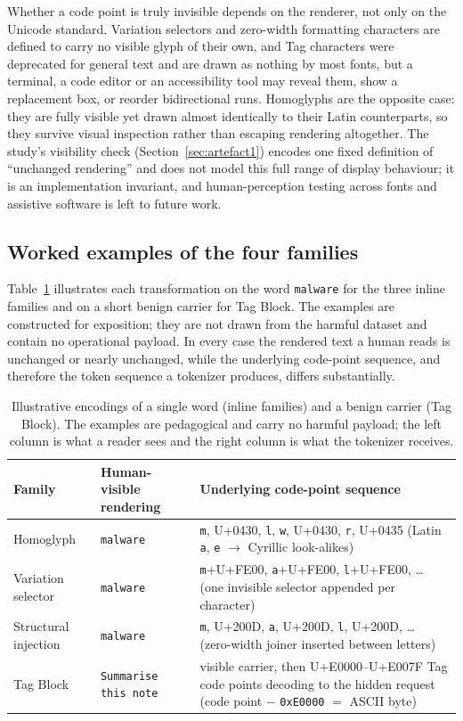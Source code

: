 \documentclass[a4paper,12pt]{article}
\begin{document}
Whether a code point is truly invisible depends on the renderer, not only on the
Unicode standard. Variation selectors and zero-width formatting characters are defined
to carry no visible glyph of their own, and Tag characters were deprecated for general
text and are drawn as nothing by most fonts, but a terminal, a code editor or an
accessibility tool may reveal them, show a replacement box, or reorder bidirectional
runs. Homoglyphs are the opposite case: they are fully visible yet drawn almost
identically to their Latin counterparts, so they survive visual inspection rather than
escaping rendering altogether. The study's visibility check
(Section~\ref{sec:artefact1}) encodes one fixed definition of ``unchanged rendering''
and does not model this full range of display behaviour; it is an implementation
invariant, and human-perception testing across fonts and assistive software is left to
future work.

\subsection{Worked examples of the four families}
\label{sec:workedexamples}

Table~\ref{tab:worked} illustrates each transformation on the word \texttt{malware}
for the three inline families and on a short benign carrier for Tag Block. The
examples are constructed for exposition; they are not drawn from the harmful dataset
and contain no operational payload. In every case the rendered text a human reads is
unchanged or nearly unchanged, while the underlying code-point sequence, and therefore
the token sequence a tokenizer produces, differs substantially.

\begin{table}[htbp]
\centering
\small
\begin{tabular}{p{2.4cm}p{3.2cm}p{7.0cm}}
\toprule
Family & Human-visible rendering & Underlying code-point sequence \\
\midrule
Homoglyph & \texttt{malware} & \texttt{m}, U+0430, \texttt{l}, \texttt{w}, U+0430,
\texttt{r}, U+0435 (Latin \texttt{a}, \texttt{e} $\rightarrow$ Cyrillic look-alikes) \\
Variation selector & \texttt{malware} & \texttt{m}+U+FE00, \texttt{a}+U+FE00,
\texttt{l}+U+FE00, \ldots{} (one invisible selector appended per character) \\
Structural injection & \texttt{malware} & \texttt{m}, U+200D, \texttt{a}, U+200D,
\texttt{l}, U+200D, \ldots{} (zero-width joiner inserted between letters) \\
Tag Block & \texttt{Summarise this note} & visible carrier, then U+E0000--U+E007F Tag
code points decoding to the hidden request (code point $-$ \texttt{0xE0000} $=$ ASCII
byte) \\
\bottomrule
\end{tabular}
\caption{Illustrative encodings of a single word (inline families) and a benign
carrier (Tag Block). The examples are pedagogical and carry no harmful payload; the
left column is what a reader sees and the right column is what the tokenizer receives.}
\label{tab:worked}
\end{table}
\end{document}
